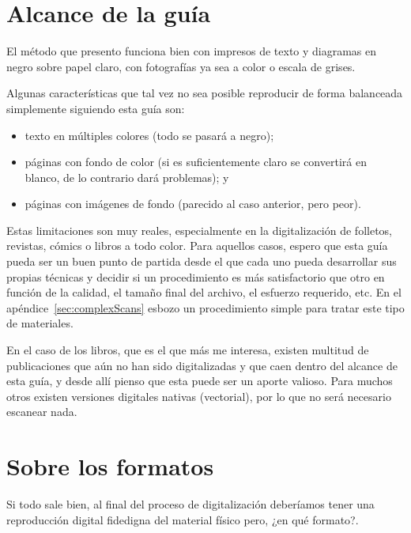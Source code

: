 \documentclass[%
	a5paper,
	10pt,
	twoside,
	openright,
	final,
]{memoir}
\begin{document}
	\section{Alcance de la guía\label{sec:scope}} El método que presento funciona bien con impresos de texto y diagramas en negro sobre papel claro, con fotografías ya sea a color o escala de grises.

	Algunas características que tal vez no sea posible reproducir de forma balanceada simplemente siguiendo esta guía son:

	\begin{itemize}[noitemsep]
		\item texto en múltiples colores (todo se pasará a negro);
		\item páginas con fondo de color (si es suficientemente claro se convertirá en blanco, de lo contrario dará problemas); y
		\item páginas con imágenes de fondo (parecido al caso anterior, pero peor).
	\end{itemize}

	Estas limitaciones son muy reales, especialmente en la digitalización de folletos, revistas, cómics o libros a todo color. Para aquellos casos, espero que esta guía pueda ser un buen punto de partida desde el que cada uno pueda desarrollar sus propias técnicas y decidir si un procedimiento es más satisfactorio que otro en función de la calidad, el tamaño final del archivo, el esfuerzo requerido, etc. En el apéndice~\ref{sec:complexScans} esbozo un procedimiento simple para tratar este tipo de materiales.

	En el caso de los libros, que es el que más me interesa, existen multitud de publicaciones que aún no han sido digitalizadas y que caen dentro del alcance de esta guía, y desde allí pienso que esta puede ser un aporte valioso. Para muchos otros existen versiones digitales nativas (\pdf vectorial), por lo que no será necesario escanear nada.

	\section{Sobre los formatos} Si todo sale bien, al final del proceso de digitalización deberíamos tener una reproducción digital fidedigna del material físico pero, ¿en qué formato?.
\end{document}
